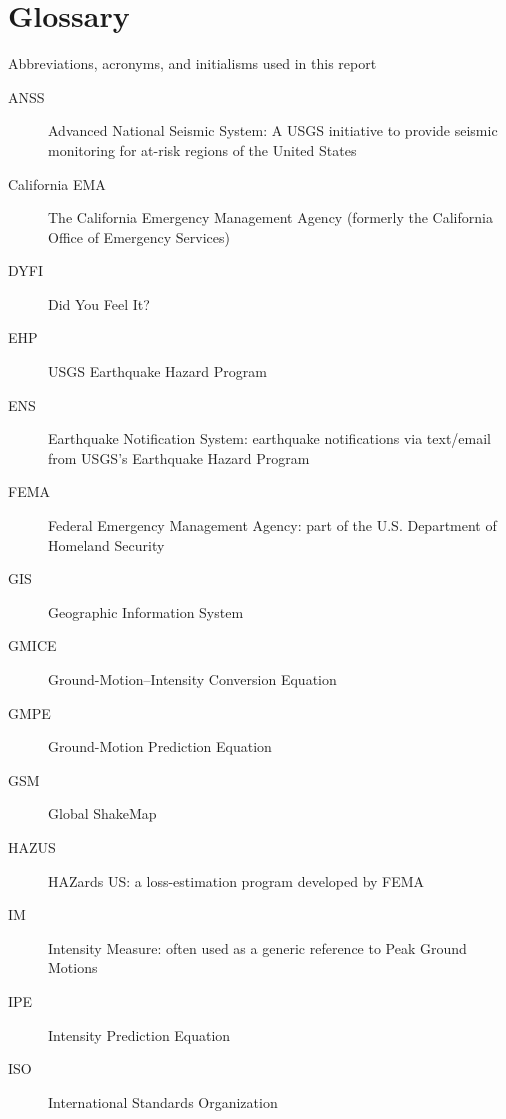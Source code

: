 \documentclass[letterpaper,10pt,english]{sphinxmanual}
\begin{document}
\chapter{Glossary}
\label{glossary:glossary}\label{glossary::doc}
Abbreviations, acronyms, and initialisms used in this report
\begin{description}
\item[{ANSS}] \leavevmode
Advanced National Seismic System: A USGS initiative to provide seismic monitoring for at-risk
regions of the United States

\item[{California EMA}] \leavevmode
The California Emergency Management Agency (formerly the California Office of Emergency Services)

\item[{DYFI}] \leavevmode
Did You Feel It?

\item[{EHP}] \leavevmode
USGS Earthquake Hazard Program

\item[{ENS}] \leavevmode
Earthquake Notification System: earthquake notifications via text/email from USGS’s Earthquake Hazard Program

\item[{FEMA}] \leavevmode
Federal Emergency Management Agency: part of the U.S. Department of Homeland Security

\item[{GIS}] \leavevmode
Geographic Information System

\item[{GMICE}] \leavevmode
Ground-Motion--Intensity Conversion Equation

\item[{GMPE}] \leavevmode
Ground-Motion Prediction Equation

\item[{GSM}] \leavevmode
Global ShakeMap

\item[{HAZUS}] \leavevmode
HAZards US: a loss-estimation program developed by FEMA

\item[{IM}] \leavevmode
Intensity Measure: often used as a generic reference to Peak Ground Motions

\item[{IPE}] \leavevmode
Intensity Prediction Equation

\item[{ISO}] \leavevmode
International Standards Organization


\end{description}
\end{document}
